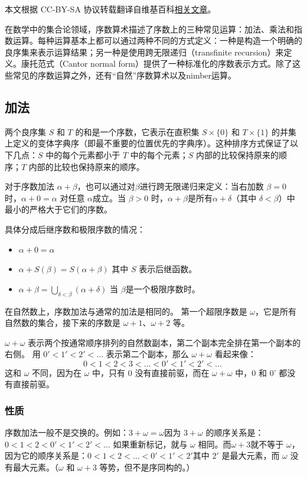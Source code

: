 
本文根据 CC-BY-SA 协议转载翻译自维基百科\href{https://en.wikipedia.org/wiki/Ordinal_arithmetic}{相关文章}。

在数学中的集合论领域，序数算术描述了序数上的三种常见运算：加法、乘法和指数运算。每种运算基本上都可以通过两种不同的方式定义：一种是构造一个明确的良序集来表示运算结果；另一种是使用跨无限递归（transfinite recursion）来定义。康托范式（Cantor normal form）提供了一种标准化的序数表示方式。除了这些常见的序数运算之外，还有“自然”序数算术以及nimber运算。
\subsection{加法}  
两个良序集 \(S\) 和 \(T\) 的和是一个序数，它表示在直积集 \(S \times \{0\}\) 和 \(T \times \{1\}\) 的并集上定义的变体字典序（即最不重要的位置优先的字典序）。这种排序方式保证了以下几点：\(S\) 中的每个元素都小于 \(T\) 中的每个元素；\(S\) 内部的比较保持原来的顺序；\(T\) 内部的比较也保持原来的顺序。 

对于序数加法 \(\alpha + \beta\)，也可以通过对\(\beta\)进行跨无限递归来定义：当右加数 \(\beta = 0\) 时，\(\alpha + 0 = \alpha\) 对任意 \(\alpha\)成立。当 \(\beta > 0\) 时，\(\alpha + \beta\)是所有\(\alpha + \delta\)（其中 \(\delta < \beta\)）中最小的严格大于它们的序数。  

具体分成后继序数和极限序数的情况：
\begin{itemize}
\item \(\alpha + 0 = \alpha\)~
\item \(\alpha + S(\beta) = S(\alpha + \beta)\) 其中 \(S\) 表示后继函数。
\item \(\alpha + \beta = \bigcup_{\delta < \beta} (\alpha + \delta)\) 当 \(\beta\)是一个极限序数时。
\end{itemize}
在自然数上，序数加法与通常的加法是相同的。  
第一个超限序数是 \(\omega\)，它是所有自然数的集合，接下来的序数是 \(\omega + 1\)、\(\omega + 2\) 等。  

\(\omega + \omega\) 表示两个按通常顺序排列的自然数副本，第二个副本完全排在第一个副本的右侧。  
用 \(0' < 1' < 2' < \dots\) 表示第二个副本，那么 \(\omega + \omega\) 看起来像：
\[
0 < 1 < 2 < 3 < \dots < 0' < 1' < 2' < \dots~
\]
这和 \(\omega\) 不同，因为在 \(\omega\) 中，只有 0 没有直接前驱，而在 \(\omega + \omega\) 中，0 和 0' 都没有直接前驱。
\subsubsection{性质}  
序数加法一般不是交换的。例如：\(3 + \omega = \omega\)因为 \(3 + \omega\) 的顺序关系是：\(0 < 1 < 2 < 0' < 1' < 2' < \dots\)
如果重新标记，就与 \(\omega\) 相同。而\(\omega + 3\)就不等于 \(\omega\)，因为它的顺序关系是：\(0 < 1 < 2 < \dots < 0' < 1' < 2'\)其中 \(2'\) 是最大元素，而 \(\omega\) 没有最大元素。（\(\omega\) 和 \(\omega + 3\) 等势，但不是序同构的。）

